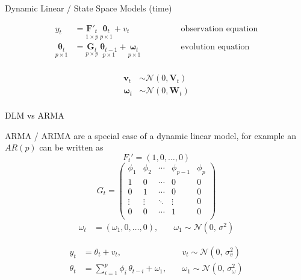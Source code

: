 \documentclass[11pt,ignorenonframetext,]{beamer}
\begin{document}
\begin{frame}{Dynamic Linear / State Space Models (time)}
\protect\hypertarget{dynamic-linear-state-space-models-time}{}

\[ 
\begin{aligned}
{{y}_t} &= \underset{1 \times p}{\symbf{F}'_t} ~ \underset{p \times 1}{\symbf{\theta}_t} + {{v}_t} 
&\qquad\qquad\text{observation equation}\\
\underset{p\times 1}{\symbf{\theta}_t} &= \underset{p \times p}{\symbf{G}_t} ~ \underset{p \times 1}{\symbf{\theta}_{t-1}}+ \underset{p \times 1}{\symbf{\omega}_t}
&\qquad\qquad\text{evolution equation}\\ 
\end{aligned}
\]

\[ 
\begin{aligned}
\symbf{v}_t &\sim \mathcal{N}(0,\symbf{V}_t) \\
\symbf{\omega}_t &\sim \mathcal{N}(0,\symbf{W}_t) \\
\end{aligned}
\]

\end{frame}

\begin{frame}[t]{DLM vs ARMA}
\protect\hypertarget{dlm-vs-arma}{}

ARMA / ARIMA are a special case of a dynamic linear model, for example
an \(AR(p)\) can be written as \[ F_t' = (1, 0, \ldots, 0) \] \[
G_t = \begin{pmatrix}
\phi_1 & \phi_2 & \cdots & \phi_{p-1} & \phi_p \\
1      & 0      & \cdots & 0          & 0      \\
0      & 1      & \cdots & 0          & 0      \\
\vdots & \vdots & \ddots & \vdots     & 0      \\
0      & 0      & \cdots & 1          & 0      \\
\end{pmatrix}
\] \[ 
\begin{aligned}
\omega_t &= (\omega_1, 0, \ldots, 0), 
\quad &\omega_1 \sim \mathcal{N}(0,\,\sigma^2)
\end{aligned}
\]

\pause

\[
\begin{aligned}
y_t &= \theta_t + v_t,
  \quad &v_t \sim \mathcal{N}(0,\, \sigma^2_v) \\
\theta_t &= \sum_{i=1}^p \phi_i\, \theta_{t-i} + \omega_1, 
  \quad &\omega_1 \sim \mathcal{N}(0,\, \sigma^2_\omega) \\
\end{aligned}
\]

\end{frame}
\end{document}
